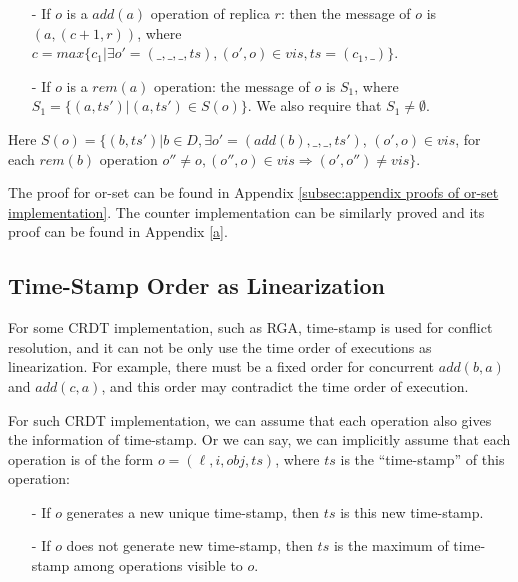 {\begin{example}
\begin{itemize}
\setlength{\itemsep}{0.5pt}
\item[-] If $o$ is a $\mathit{add}(a)$ operation of replica $r$:  then the message of $o$ is $(a,(c+1,r))$, where $c = \mathit{max}\{ c_1 \vert \exists o' = (\_,\_,\_,\mathit{ts}), (o',o) \in \mathit{vis}, \mathit{ts} = (c_1,\_) \}$.

\item[-] If $o$ is a $\mathit{rem}(a)$ operation: the message of $o$ is $S_1$, where $S_1 = \{ (a,\mathit{ts}') \vert (a,\mathit{ts}') \in S(o) \}$. We also require that $S_1 \neq \emptyset$.
\end{itemize}
Here $S(o) = \{ (b,\mathit{ts}') \vert b \in D, \exists o' = (\mathit{add}(b),\_,\_,\mathit{ts}')$, $(o',o) \in \mathit{vis}$, for each $\mathit{rem}(b)$ operation $o'' \neq o, (o'',o) \in \mathit{vis} \Rightarrow (o',o'') \neq \mathit{vis} \}$.
\end{example}

The proof for or-set can be found in Appendix \ref{subsec:appendix proofs of or-set implementation}. The counter implementation can be similarly proved and its proof can be found in Appendix \ref{a}.




\subsection{Time-Stamp Order as Linearization}
\label{subsec:time-stamp order as linearizabtion}

For some CRDT implementation, such as RGA, time-stamp is used for conflict resolution, and it can not be only use the time order of executions as linearization. For example, there must be a fixed order for concurrent $\mathit{add}(b,a)$ and $\mathit{add}(c,a)$, and this order may contradict the time order of execution.

For such CRDT implementation, we can assume that each operation also gives the information of time-stamp. Or we can say, we can implicitly assume that each operation is of the form $o = (\ell,i,\mathit{obj},\mathit{ts})$, where $\mathit{ts}$ is the ``time-stamp'' of this operation:

\begin{itemize}
\setlength{\itemsep}{0.5pt}
\item[-] If $o$ generates a new unique time-stamp, then $\mathit{ts}$ is this new time-stamp.

\item[-] If $o$ does not generate new time-stamp, then $\mathit{ts}$ is the maximum of time-stamp among operations visible to $o$.


\end{itemize}}
